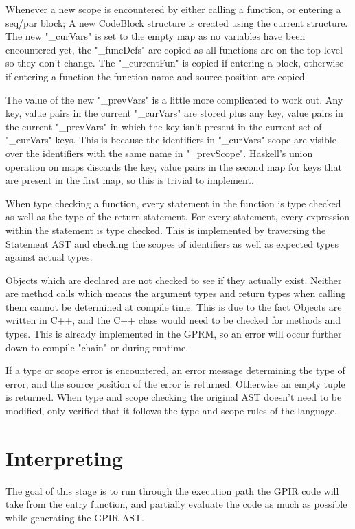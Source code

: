 Whenever a new scope is encountered by either calling a function, or entering a seq/par block;
A new CodeBlock structure is created using the current structure. The new "\_curVars"
is set to the empty map as no variables have been encountered yet, the "\_funcDefs"
are copied as all functions are on the top level so they don't change. The "\_currentFun"
is copied if entering a block, otherwise if entering a function the function name
and source position are copied. 

The value of the new "\_prevVars" is a little more complicated to work out.
Any key, value pairs in the current "\_curVars" are stored plus any key, value pairs in the current "\_prevVars" in which the key isn't present in the current 
set of "\_curVars" keys. This is because
the identifiers in "\_curVars" scope are visible over the identifiers with
the same name in "\_prevScope". Haskell's union operation on maps
discards the key, value pairs in the second map for keys that are
present in the first map, so this is trivial to implement.

When type checking a function, every statement in the function is type checked
as well as the type of the return statement. For every statement,
every expression within the statement is type checked. This is implemented by traversing
the Statement AST and checking the scopes of identifiers as well as expected types
against actual types.

Objects which are declared are not checked to see if they actually exist. Neither
are method calls which means the argument types and return types when calling them
cannot be determined at compile time. This is due to the fact Objects are written
in C++, and the C++ class would need to be checked for methods and types. This is already
implemented in the GPRM, so an error will occur further down to compile "chain" or during
runtime.

If a type or scope error is encountered, an error message determining the type of error,
and the source position of the error is returned. Otherwise an empty tuple is returned.
When type and scope checking the original AST doesn't need to be modified, only verified
that it follows the type and scope rules of the language.


\section{Interpreting}

The goal of this stage is to run through the execution path the GPIR code
will take from the entry function, and partially evaluate the code as much
as possible while generating the GPIR AST.

